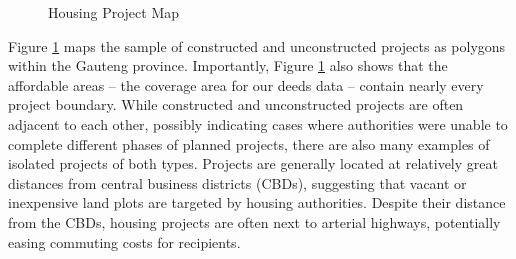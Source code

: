\documentclass[12pt]{article}
\begin{document}


\begin{figure}[t!]
\centering
\caption{Housing Project Map}\label{figure:map}
\end{figure}

Figure \ref{figure:map} maps the sample of constructed and unconstructed projects as polygons within the Gauteng province. Importantly, Figure \ref{figure:map} also shows that the affordable areas -- the coverage area for our deeds data -- contain nearly every project boundary. While constructed and unconstructed projects are often adjacent to each other, possibly indicating cases where authorities were unable to complete different phases of planned projects, there are also many examples of isolated projects of both types.  Projects are generally located at relatively great distances from central business districts (CBDs), suggesting that vacant or inexpensive land plots are targeted by housing authorities.  Despite their distance from the CBDs, housing projects are often next to arterial highways, potentially easing commuting costs for recipients.


\end{document}
